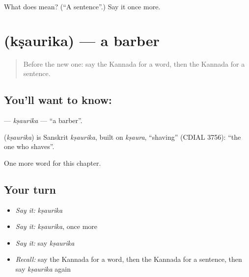 \begin{tcolorbox}[breakable,colback=teal!4,colframe=teal!35!black,title={Before you move on}]
What does  mean? (\textquotedblleft{}A sentence\textquotedblright{}.) Say it once more.
\end{tcolorbox}
\section[\texorpdfstring{\kn{ಕ್ಷೌರಿಕ} (kṣaurika)}{ಕ್ಷೌರಿಕ (kṣaurika)}]{ (kṣaurika) — a barber}

\label{lesson:KA-C270-ksaurika}



\begin{quote}
Before the new one: say the Kannada for a word, then the Kannada for a sentence.
\end{quote}

\subsection*{You'll want to know: }
\textbf{} — \emph{kṣaurika} — \textquotedblleft{}a barber\textquotedblright{}.

\begin{cousinweb}
\textbf{} (\emph{kṣaurika}) is Sanskrit \emph{kṣaurika}, built on \emph{kṣaura}, \textquotedblleft{}shaving\textquotedblright{} (CDIAL 3756): \textquotedblleft{}the one who shaves\textquotedblright{}.
\end{cousinweb}

\begin{grammarlens}[title={What you've built}]
One more word for this chapter.
\end{grammarlens}

\subsection*{Your turn}
\begin{itemize}
\raggedright
  \item \emph{Say it:} \emph{kṣaurika}
  \item \emph{Say it:} \emph{kṣaurika}, once more
  \item \emph{Say it:} say \emph{kṣaurika}
  \item \emph{Recall:} say the Kannada for a word, then the Kannada for a sentence, then say \emph{kṣaurika} again
\end{itemize}

